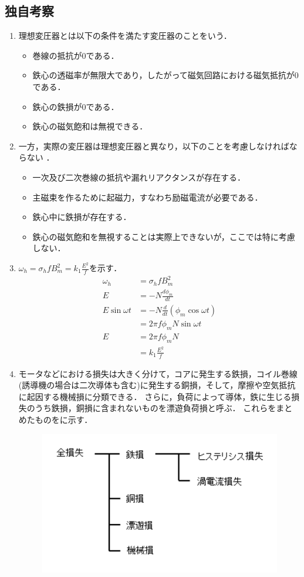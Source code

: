 \clearpage
\subsection{独自考察}
\begin{enumerate}[1.]
	\item 理想変圧器とは以下の条件を満たす変圧器のことをいう\cite{1130000795154912128}．
\begin{itemize}
	\item 巻線の抵抗が0である．
	\item 鉄心の透磁率が無限大であり，したがって磁気回路における磁気抵抗が0である．
	\item 鉄心の鉄損が0である．
	\item 鉄心の磁気飽和は無視できる．
\end{itemize}
\item 一方，実際の変圧器は理想変圧器と異なり，以下のことを考慮しなければならない
\label{real}
\cite{1130154912128}．
\begin{itemize}
	\item 一次及び二次巻線の抵抗や漏れリアクタンスが存在する．
	\item 主磁束を作るために起磁力，すなわち励磁電流が必要である．
	\item 鉄心中に鉄損が存在する．
	\item 鉄心の磁気飽和を無視することは実際上できないが，ここでは特に考慮しない．
\end{itemize}
\item $\omega_{h}=\sigma_{h}fB_{m}^{2}=k_{1}\frac{E^{2}}{f}$を示す．
\begin{align*}
	\omega_{h}&=\sigma_{h}fB_{m}^{2}\\
	E&=-N\frac{d\phi_{m}}{d t}\\
	E\sin \omega t&=-N\frac{d}{dt}(\phi_{m} \cos \omega t)\\ 
	&=2\pi f \phi_{m} N\sin \omega t\\
	E&=2\pi f \phi_{m} N\\
	&=k_{1}\frac{E^{2}}{f}
\end{align*}
\item モータなどにおける損失は大きく分けて，コアに発生する鉄損，コイル巻線(誘導機の場合は二次導体も含む)に発生する銅損，そして，摩擦や空気抵抗に起因する機械損に分類できる．
さらに，負荷によって導体，鉄に生じる損失のうち鉄損，銅損に含まれないものを漂遊負荷損と呼ぶ．
これらをまとめたものをに示す．
\begin{figure}[h]
	\centering
	\includegraphics[scale=0.8]{./fig/loss_analysis.pdf}

\end{figure}
\end{enumerate}
